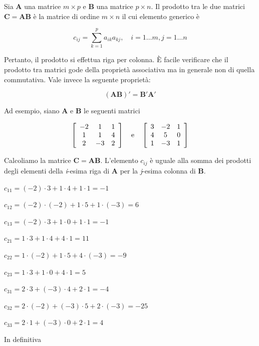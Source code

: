 \documentclass[
  11pt,
]{krantz}
\theoremstyle{definition}
\theoremstyle{definition}
\theoremstyle{definition}
\theoremstyle{definition}
\theoremstyle{remark}
\begin{document}
Sia \(\boldsymbol{A}\) una matrice \(m \times p\) e \(\boldsymbol{B}\) una matrice \(p \times n\). Il prodotto tra le due matrici \(\boldsymbol{C} = \boldsymbol{AB}\) è la matrice di ordine \(m \times n\) il cui elemento generico è

\[
c_{ij} = \sum_{k=1}^{p} a_{ik}a_{kj},  \quad        i = 1 \dots m,
j = 1 \dots n
\]

Pertanto, il prodotto si effettua riga per colonna. È facile verificare che il prodotto tra matrici gode della proprietà associativa ma in generale non di quella commutativa. Vale invece la seguente proprietà:

\[
(\boldsymbol{AB})' = \boldsymbol{B}'\boldsymbol{A}'
\]

Ad esempio, siano \(\boldsymbol{A}\) e \(\boldsymbol{B}\) le seguenti matrici

\[
\left[ \begin{array}{c c c}
-2 & 1 & 1\\
1 & 1 & 4\\
2 & -3 & 2
\end{array}
 \right] \quad \text{e} \quad
\left[ \begin{array}{c c c}
3 & -2 &1\\
4 & 5 & 0\\
1 & -3 & 1
\end{array}
 \right]
 \]

Calcoliamo la matrice \(\boldsymbol{C} = \boldsymbol{AB}\). L'elemento \(c_{ij}\) è uguale alla somma dei prodotti degli elementi della \emph{i}-esima riga di \(\boldsymbol{A}\) per la \emph{j}-esima colonna di \(\boldsymbol{B}\).

\(c_{11} = (-2) \cdot 3 + 1 \cdot 4 + 1 \cdot 1 = -1\)

\(c_{12} = (-2) \cdot (-2) + 1 \cdot 5 + 1 \cdot (-3) = 6\)

\(c_{13} = (-2) \cdot 3 + 1 \cdot 0 + 1 \cdot 1 = -1\)

\(c_{21} = 1 \cdot 3 + 1 \cdot 4 + 4 \cdot 1 = 11\)

\(c_{22} = 1 \cdot (-2) + 1 \cdot 5 + 4 \cdot (-3) = -9\)

\(c_{23} = 1 \cdot 3 + 1 \cdot 0 + 4 \cdot 1 = 5\)

\(c_{31} = 2 \cdot 3 +(-3) \cdot 4 + 2 \cdot 1 = -4\)

\(c_{32} = 2 \cdot (-2) +(-3) \cdot 5 + 2 \cdot (-3) = -25\)

\(c_{33} = 2 \cdot 1 + (-3) \cdot 0 + 2 \cdot 1 = 4\)

In definitiva
\end{document}
